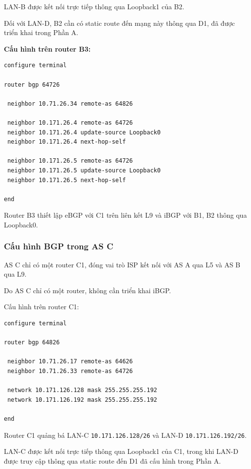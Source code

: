 LAN-B được kết nối trực tiếp
thông qua Loopback1 của B2.

Đối với LAN-D, B2 cần có
static route đến mạng này
thông qua D1, đã được triển khai
trong Phần A.

\textbf{Cấu hình trên router B3:}

\begin{lstlisting}
configure terminal

router bgp 64726

 neighbor 10.71.26.34 remote-as 64826

 neighbor 10.171.26.4 remote-as 64726
 neighbor 10.171.26.4 update-source Loopback0
 neighbor 10.171.26.4 next-hop-self

 neighbor 10.171.26.5 remote-as 64726
 neighbor 10.171.26.5 update-source Loopback0
 neighbor 10.171.26.5 next-hop-self

end
\end{lstlisting}

Router B3 thiết lập eBGP với C1
trên liên kết L9 và iBGP với
B1, B2 thông qua Loopback0.



\subsubsection{Cấu hình BGP trong AS C}

AS C chỉ có một router C1,
đóng vai trò ISP kết nối với
AS A qua L5 và AS B qua L9.

Do AS C chỉ có một router,
không cần triển khai iBGP.

Cấu hình trên router C1:

\begin{lstlisting}
configure terminal

router bgp 64826

 neighbor 10.71.26.17 remote-as 64626
 neighbor 10.71.26.33 remote-as 64726

 network 10.171.126.128 mask 255.255.255.192
 network 10.171.126.192 mask 255.255.255.192

end
\end{lstlisting}

Router C1 quảng bá LAN-C
\texttt{10.171.126.128/26}
và LAN-D \texttt{10.171.126.192/26}.

LAN-C được kết nối trực tiếp
thông qua Loopback1 của C1,
trong khi LAN-D được truy cập
thông qua static route đến D1
đã cấu hình trong Phần A.



